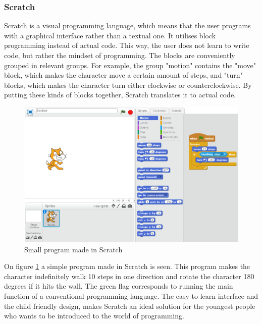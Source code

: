
\subsubsection{Scratch}
Scratch is a visual programming language, which means that the user programs with a graphical interface rather than a textual one. It utilises block programming instead of actual code. This way, the user does not learn to write code, but rather the mindset of programming. The blocks are conveniently grouped in relevant groups. For example, the group "motion" contains the "move" block, which makes the character move a certain amount of steps, and "turn" blocks, which makes the character turn either clockwise or counterclockwise. By putting these kinds of blocks together, Scratch translates it to actual code.

\begin{figure}[H]
\centering
\includegraphics[scale=0.5]{resources/Images/Scratch.png}
\caption{Small program made in Scratch}
\label{fig:Scratch}
\end{figure}

On figure \ref{fig:Scratch} a simple program made in Scratch is seen. This program makes the character indefinitely walk 10 steps in one direction and rotate the character 180 degrees if it hits the wall. The green flag corresponds to running the main function of a conventional programming language.
The easy-to-learn interface and the child friendly design, makes Scratch an ideal solution for the youngest people who wants to be introduced to the world of programming.\cite{scratch}

